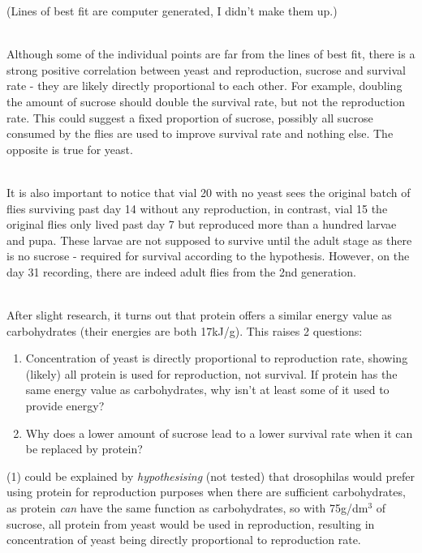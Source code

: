 \documentclass{article}
\begin{document}
\noindent
(Lines of best fit are computer generated, I didn't make them up.)

\noindent\\
Although some of the individual points are far from the lines of best fit, there is a strong positive correlation between yeast and reproduction, sucrose and survival rate - they are likely directly proportional to each other. For example, doubling the amount of sucrose should double the survival rate, but not the reproduction rate. This could suggest a fixed proportion of sucrose, possibly all sucrose consumed by the flies are used to improve survival rate and nothing else. The opposite is true for yeast.

\noindent\\
It is also important to notice that vial 20 with no yeast sees the original batch of flies surviving past day 14 without any reproduction, in contrast, vial 15 the original flies only lived past day 7 but reproduced more than a hundred larvae and pupa. These larvae are not supposed to survive until the adult stage as there is no sucrose - required for survival according to the hypothesis. However, on the day 31 recording, there are indeed adult flies from the 2nd generation.

\noindent\\
After slight research, it turns out that protein offers a similar energy value as carbohydrates (their energies are both 17kJ/g)\cite{protein_energy}. This raises 2 questions:

\begin{enumerate}
  \item Concentration of yeast is directly proportional to reproduction rate, showing (likely) all protein is used for reproduction, not survival. If protein has the same energy value as carbohydrates, why isn't at least some of it used to provide energy?
  \item Why does a lower amount of sucrose lead to a lower survival rate when it can be replaced by protein?
\end{enumerate}

\noindent
(1) could be explained by \emph{hypothesising} (not tested) that drosophilas would prefer using protein for reproduction purposes when there are sufficient carbohydrates, as protein \emph{can} have the same function as carbohydrates, so with 75g/dm$^3$ of sucrose, all protein from yeast would be used in reproduction, resulting in concentration of yeast being directly proportional to reproduction rate.
\end{document}
